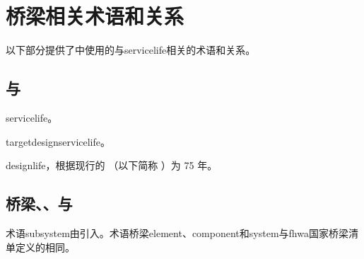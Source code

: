 \section{桥梁相关术语和关系}\label{sec:BSL-terminology-relationship}
以下部分提供了中使用的与\gls*{servicelife}相关的术语和关系。

\subsection{与}
\begin{description}[style=nextline,leftmargin=10.5em]
  \item[\gls{servicelife}] \glsdesc{servicelife}。
  \item[\gls{targetdesignservicelife}] \glsdesc{targetdesignservicelife}。
  \item[\gls{designlife}] \glsdesc{designlife}，根据现行的 （以下简称 \lrfd）为 75 年。
\end{description}

\subsection{桥梁、、与}
术语\gls{subsystem}由引入。术语桥梁\gls{element}、\gls{component}和\gls{system}与\gls{fhwa}国家桥梁清单定义的相同。

